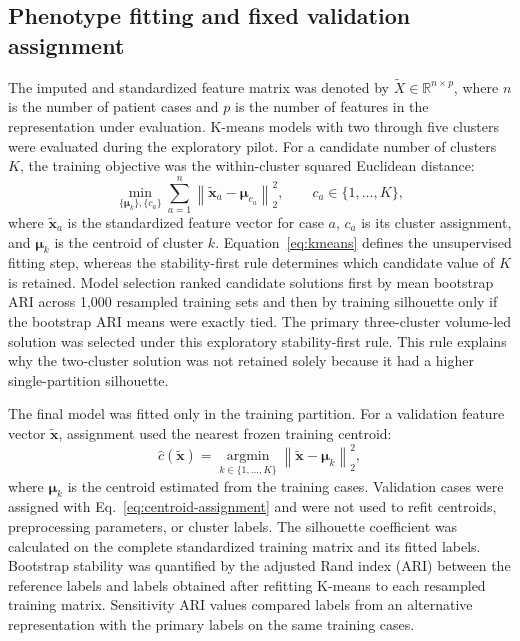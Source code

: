 \documentclass[utf8]{FrontiersinVancouver}
\begin{document}
\subsection{Phenotype fitting and fixed validation assignment}
The imputed and standardized feature matrix was denoted by $\widetilde{X}\in\mathbb{R}^{n\times p}$, where $n$ is the number of patient cases and $p$ is the number of features in the representation under evaluation. K-means models with two through five clusters were evaluated during the exploratory pilot. For a candidate number of clusters $K$, the training objective was the within-cluster squared Euclidean distance:
\begin{equation}
\min_{\{\boldsymbol{\mu}_k\},\{c_a\}}\sum_{a=1}^{n}\left\|\widetilde{\boldsymbol{x}}_a-\boldsymbol{\mu}_{c_a}\right\|_2^2,
\qquad c_a\in\{1,\ldots,K\},
\label{eq:kmeans}
\end{equation}
where $\widetilde{\boldsymbol{x}}_a$ is the standardized feature vector for case $a$, $c_a$ is its cluster assignment, and $\boldsymbol{\mu}_k$ is the centroid of cluster $k$. Equation~\ref{eq:kmeans} defines the unsupervised fitting step, whereas the stability-first rule determines which candidate value of $K$ is retained. Model selection ranked candidate solutions first by mean bootstrap ARI across 1,000 resampled training sets and then by training silhouette only if the bootstrap ARI means were exactly tied. The primary three-cluster volume-led solution was selected under this exploratory stability-first rule. This rule explains why the two-cluster solution was not retained solely because it had a higher single-partition silhouette.

The final model was fitted only in the training partition. For a validation feature vector $\widetilde{\boldsymbol{x}}$, assignment used the nearest frozen training centroid:
\begin{equation}
\widehat{c}(\widetilde{\boldsymbol{x}})=\underset{k\in\{1,\ldots,K\}}{\operatorname{argmin}}\left\|\widetilde{\boldsymbol{x}}-\boldsymbol{\mu}_k\right\|_2^2,
\label{eq:centroid-assignment}
\end{equation}
where $\boldsymbol{\mu}_k$ is the centroid estimated from the training cases. Validation cases were assigned with Eq.~\ref{eq:centroid-assignment} and were not used to refit centroids, preprocessing parameters, or cluster labels. The silhouette coefficient was calculated on the complete standardized training matrix and its fitted labels. Bootstrap stability was quantified by the adjusted Rand index (ARI) between the reference labels and labels obtained after refitting K-means to each resampled training matrix. Sensitivity ARI values compared labels from an alternative representation with the primary labels on the same training cases.
\end{document}
